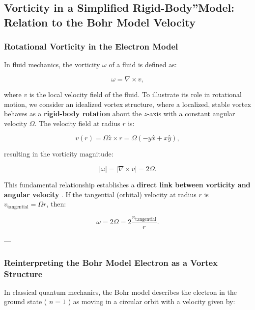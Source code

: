 

\subsection{Vorticity in a Simplified \grqq Rigid-Body\textquotedblright Model: Relation to the Bohr Model Velocity}

\subsubsection*{Rotational Vorticity in the Electron Model}

In fluid mechanics, the vorticity \( \omega \) of a fluid is defined as:

\begin{equation*}
    \omega = \nabla \times v,
\end{equation*}

where \( v \) is the local velocity field of the fluid. To illustrate its role in rotational motion, we consider an idealized vortex structure, where a localized, stable vortex behaves as a \textbf{rigid-body rotation} about the \( z \)-axis with a constant angular velocity \( \Omega \). The velocity field at radius \( r \) is:

\begin{equation*}
    v(r) = \Omega ẑ \times r = \Omega(-yx̂ + xŷ),
\end{equation*}

resulting in the vorticity magnitude:

\begin{equation*}
    |\omega| = |\nabla \times v| = 2\Omega.
\end{equation*}

This fundamental relationship establishes a \textbf{direct link between vorticity and angular velocity} \cite{lamb_hydrodynamics, feynman_qed}. If the tangential (orbital) velocity at radius \( r \) is \( v_\text{tangential} = \Omega r \), then:

\begin{equation*}
    \omega = 2\Omega = 2\frac{v_\text{tangential}}{r}.
\end{equation*}

---

\subsubsection*{Reinterpreting the Bohr Model Electron as a Vortex Structure}

In classical quantum mechanics, the Bohr model describes the electron in the ground state ( \( n = 1 \) ) as moving in a circular orbit with a velocity given by:

